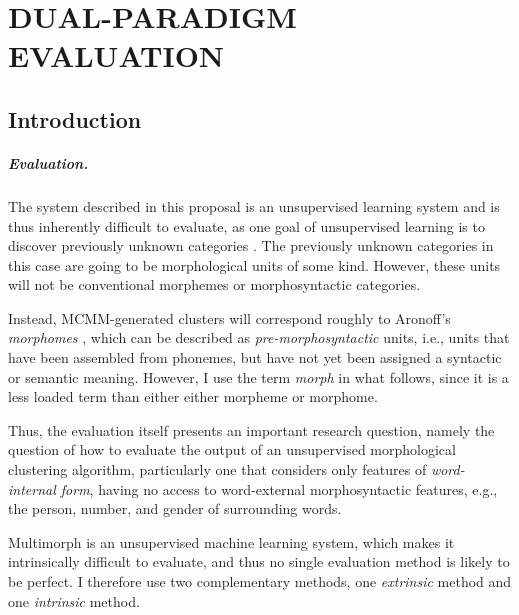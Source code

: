 \chapter{DUAL-PARADIGM EVALUATION}
\label{ch:eval}

\section{Introduction}

\paragraph{Evaluation.} The system described in this proposal is an unsupervised 
learning system and is thus inherently difficult to evaluate, as one goal of 
unsupervised learning is to discover previously unknown categories \citep{parsons:2004}.
The previously unknown categories in this case are going to be morphological 
units of some kind. However, these units will not be conventional morphemes 
or morphosyntactic categories. 

Instead, MCMM-generated clusters will correspond roughly to Aronoff's 
\emph{morphomes} \citep{aronoff:1994}, which can be described as 
\emph{pre-morphosyntactic} units, i.e., units that have been assembled from 
phonemes, but have not yet been assigned 
a syntactic or semantic meaning. However,  I use the term \emph{morph} in what follows, since it is a less loaded term than either
either morpheme or morphome.

Thus, the evaluation itself presents an important research question, namely the question 
of how to evaluate the output of an unsupervised morphological clustering algorithm, 
particularly one that considers only features of \emph{word-internal form}, having no 
access to word-external morphosyntactic features, e.g., the person, number, and 
gender of  surrounding words.

Multimorph is an unsupervised machine learning system, which makes it 
intrinsically difficult to evaluate, and thus no single 
evaluation method is likely to be perfect. I therefore use two complementary methods, %
one \emph{extrinsic} method and one \emph{intrinsic} method.

